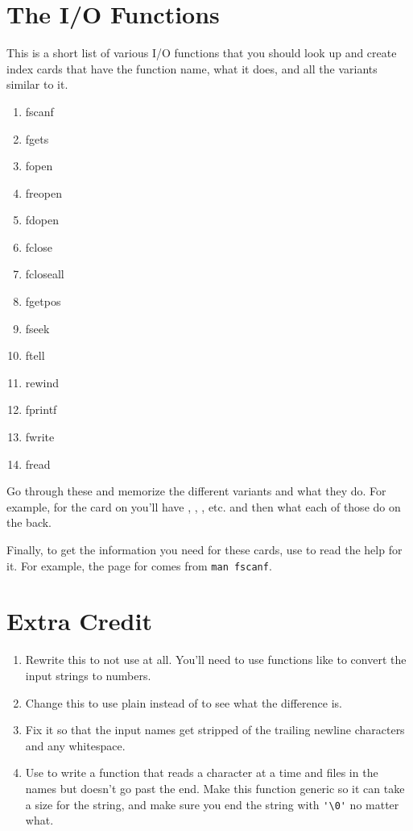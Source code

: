 \section{The I/O Functions}

This is a short list of various I/O functions that you should look up and
create index cards that have the function name, what it does, and all the
variants similar to it.

\begin{enumerate}
\item fscanf
\item fgets
\item fopen
\item freopen
\item fdopen
\item fclose
\item fcloseall
\item fgetpos
\item fseek
\item ftell
\item rewind
\item fprintf
\item fwrite
\item fread
\end{enumerate}

Go through these and memorize the different variants and what they do.  For example,
for the card on  you'll have , , ,
etc. and then what each of those do on the back.

Finally, to get the information you need for these cards, use  to
read the help for it.  For example, the page for  comes from 
\verb|man fscanf|.


\section{Extra Credit}

\begin{enumerate}
\item Rewrite this to not use  at all.  You'll need to use
    functions like  to convert the input strings to numbers.
\item Change this to use plain  instead of  to
    see what the difference is.
\item Fix it so that the input names get stripped of the trailing newline
    characters and any whitespace.
\item Use  to write a function that reads a character at a time
    and files in the names but doesn't go past the end.  Make this function
    generic so it can take a size for the string, and make sure you end
    the string with \verb|'\0'| no matter what.
\end{enumerate}

